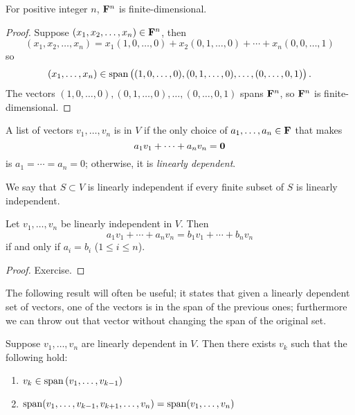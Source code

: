 \begin{exercise}
For positive integer $n$, $\mathbf F^n$ is finite-dimensional.
\end{exercise}

\begin{proof}
Suppose $(x_1,x_2,\dots,x_n)\in\mathbf F^n$, then
\[(x_1,x_2,\dots,x_n)=x_1(1,0,\dots,0)+x_2(0,1,\dots,0)+\cdots+x_n(0,0,\dots,1)\]
so
\[(x_1,\dots,x_n)\in\operatorname{span}\left((1,0,\dots,0),(0,1,\dots,0),\dots,(0,\dots,0,1)\right).\]
The vectors $(1,0,\dots,0),(0,1,\dots,0),\dots,(0,\dots,0,1)$ spans $\mathbf F^n$, so $\mathbf F^n$ is finite-dimensional.
\end{proof}

\begin{definition}
A list of vectors $v_1,\dots,v_n$ is  in $V$ if the only choice of $a_1,\dots,a_n\in\mathbf F$ that makes
\[a_1v_1+\cdots+a_nv_n=\vb{0}\]
is $a_1=\cdots=a_n=0$; otherwise, it is \emph{linearly dependent}.

We say that $S\subset V$ is linearly independent if every finite subset of $S$ is linearly independent.
\end{definition}

\begin{proposition}
Let $v_1,\dots,v_n$ be linearly independent in $V$. Then
\[a_1v_1+\cdots+a_nv_n=b_1v_1+\cdots+b_nv_n\]
if and only if $a_i=b_i$ ($1\le i\le n$).
\end{proposition}

\begin{proof}
Exercise.
\end{proof}

The following result will often be useful; it states that given a linearly dependent set of vectors, one of the vectors is in the span of the previous ones; furthermore we can throw out that vector without changing the span of the original set.

\begin{lemma}\label{lemma:linear-dependence}
Suppose $v_1,\dots,v_n$ are linearly dependent in $V$. Then there exists $v_k$ such that the following hold:
\begin{enumerate}[label=(\roman*)]
\item $v_k\in\operatorname{span}\left(v_1,\dots,v_{k-1}\right)$
\item $\operatorname{span}(v_1,\dots,v_{k-1},v_{k+1},\dots,v_n)=\operatorname{span}(v_1,\dots,v_n)$
\end{enumerate}
\end{lemma}

